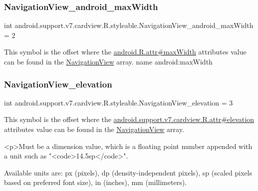 \subsubsection{\texorpdfstring{Navigation\+View\+\_\+android\+\_\+max\+Width}{NavigationView\_android\_maxWidth}}
{\footnotesize\ttfamily int android.\+support.\+v7.\+cardview.\+R.\+styleable.\+Navigation\+View\+\_\+android\+\_\+max\+Width = 2\hspace{0.3cm}{\ttfamily [static]}}

This symbol is the offset where the \hyperlink{}{android.\+R.\+attr\#max\+Width} attribute\textquotesingle{}s value can be found in the \hyperlink{classandroid_1_1support_1_1v7_1_1cardview_1_1R_1_1styleable_aab4216e563b2e19093e1d57494734202}{Navigation\+View} array.  name android\+:max\+Width \mbox{\label{classandroid_1_1support_1_1v7_1_1cardview_1_1R_1_1styleable_af1ff40b9d01cd7c460e4f0b93cbb4bdf}} 
\subsubsection{\texorpdfstring{Navigation\+View\+\_\+elevation}{NavigationView\_elevation}}
{\footnotesize\ttfamily int android.\+support.\+v7.\+cardview.\+R.\+styleable.\+Navigation\+View\+\_\+elevation = 3\hspace{0.3cm}{\ttfamily [static]}}

This symbol is the offset where the \hyperlink{classandroid_1_1support_1_1v7_1_1cardview_1_1R_1_1attr_af8da2ee4ea221f8d413747edbfbf8ccb}{android.\+support.\+v7.\+cardview.\+R.\+attr\#elevation} attribute\textquotesingle{}s value can be found in the \hyperlink{classandroid_1_1support_1_1v7_1_1cardview_1_1R_1_1styleable_aab4216e563b2e19093e1d57494734202}{Navigation\+View} array.

\begin{DoxyVerb}      <p>Must be a dimension value, which is a floating point number appended with a unit such as "<code>14.5sp</code>".
\end{DoxyVerb}
 Available units are\+: px (pixels), dp (density-\/independent pixels), sp (scaled pixels based on preferred font size), in (inches), mm (millimeters). 

